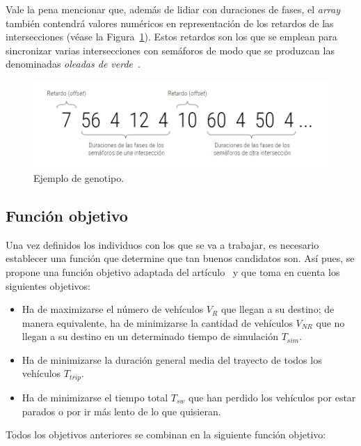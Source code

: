 Vale la pena mencionar que, además de lidiar con duraciones de fases, el \textit{array} también contendrá valores numéricos en representación de los retardos de las intersecciones (véase la Figura~\ref{fig:genotipo}). Estos retardos son los que se emplean para sincronizar varias intersecciones con semáforos de modo que se produzcan las denominadas \textit{oleadas de verde}~\cite{segredo_optimising_2019}.


\begin{figure}[ht]
    \centering
    \includegraphics[width=\textwidth]{report/images/genotipo.png}
    \caption{Ejemplo de genotipo.}
    \label{fig:genotipo}
\end{figure}


\subsection{Función objetivo}
\label{subsec:funcion}

Una vez definidos los individuos con los que se va a trabajar, es necesario establecer una función que determine que tan buenos candidatos son. Así pues, se propone una función objetivo adaptada del artículo~\cite{segredo_optimising_2019} y que toma en cuenta los siguientes objetivos:

\begin{itemize}
    \item Ha de maximizarse el número de vehículos $V_R$ que llegan a su destino; de manera equivalente, ha de minimizarse la cantidad de vehículos $V_{NR}$ que no llegan a su destino en un determinado tiempo de simulación $T_{sim}$.
    \item Ha de minimizarse la duración general media del trayecto de todos los vehículos $T_{trip}$.
    \item Ha de minimizarse el tiempo total $T_{sw}$ que han perdido los vehículos por estar parados o por ir más lento de lo que quisieran.
\end{itemize}

Todos los objetivos anteriores se combinan en la siguiente función objetivo:

